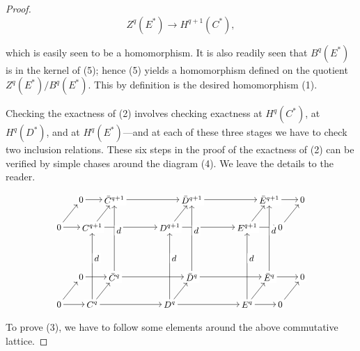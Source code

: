 \begin{proof}
\begin{equation}
\tag{5}\label{eq:5.17:5}
Z^{q}(E^{*})\to H^{q+1}(C^{*}),
\end{equation}

which is easily seen to be a homomorphism. It is also readily seen that  $ B^{q}(E^{*}) $ is in the kernel of (5); hence (5) yields a homomorphism defined on the quotient  $ Z^{q}(E^{*})/B^{q}(E^{*}) $. This by definition is the desired homomorphism (1).

Checking the exactness of (2) involves checking exactness at  $ H^{q}(C^{*}) $, at  $ H^{q}(D^{*}) $, and at  $ H^{q}(E^{*}) $—and at each of these three stages we have to check two inclusion relations. These six steps in the proof of the exactness of (2) can be verified by simple chases around the diagram (4). We leave the details to the reader.

\[
\begin{tikzpicture}[baseline={(current bounding box.center)},every node/.style={font=\small,fill=white,inner sep=2pt}]
\foreach \y/\q/\pfx in {0/q/f,2.8/{q+1}/u}{
 \node(\pfx 0)at(-1.2,\y){$0$};
 \node(\pfx C)at(0,\y){$C^{\q}$};
 \node(\pfx D)at(2.8,\y){$D^{\q}$};
 \node(\pfx E)at(5.6,\y){$E^{\q}$};
 \node(\pfx Z)at(6.8,\y){$0$};
 \node(\pfx b0)at(-.4,\y+1){$0$};
 \node(\pfx bC)at(.8,\y+1){$\bar C^{\q}$};
 \node(\pfx bD)at(3.6,\y+1){$\bar D^{\q}$};
 \node(\pfx bE)at(6.4,\y+1){$\bar E^{\q}$};
 \node(\pfx bZ)at(7.6,\y+1){$0$};
 \foreach \a/\b in {0/C,C/D,D/E,E/Z,b0/bC,bC/bD,bD/bE,bE/bZ}{\draw[->](\pfx\a)--(\pfx\b);}
 \foreach \a in {0,C,D,E,Z}{\draw[->](\pfx\a)--(\pfx b\a);}
}
\foreach \a in {C,D,E,bC,bD,bE}{\draw[->](f\a)--node[pos=.62,right]{$d$}(u\a);}
\end{tikzpicture}
\]

To prove (3), we have to follow some elements around the above commutative lattice.


\end{proof}
